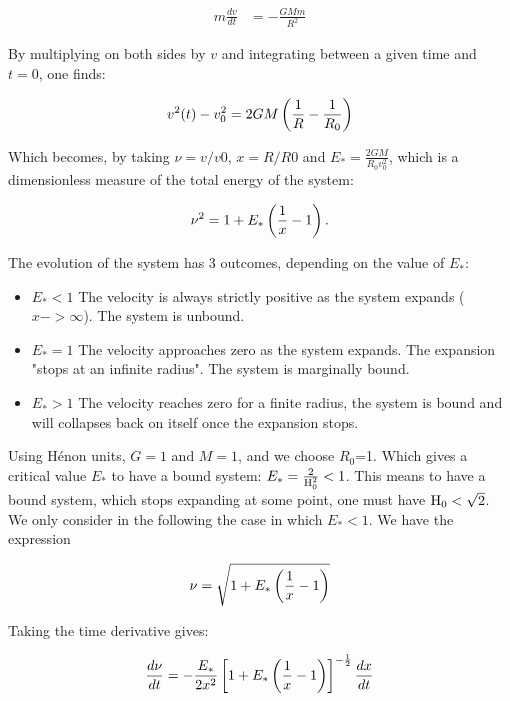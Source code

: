 \begin{align}\label{eq:newton}
m \frac{dv}{dt} & = - \frac{G M m}{R^2}
\end{align}

By multiplying on both sides by $v$ and integrating between a given time and $t=0$, one finds:

\begin{equation}
v^2(t) - v^2_0 = 2GM \left( \frac{1}{R} - \frac{1}{R_0} \right)
\end{equation}

Which becomes, by taking $\nu = v/v0$,  $x= R/R0$ and $E_\ast = \frac{2GM}{R_0 v_0^2}$, which is a dimensionless measure of the total energy of the system:

\begin{equation}
\nu^2  = 1 + E_\ast \left( \frac{1}{x} - 1 \right) .
\end{equation}

The evolution of the system has 3 outcomes, depending on the value of $E_\ast$:
\begin{itemize}
\item $E_\ast<1$ The velocity is always strictly positive as the system expands ($x->\infty$). The system is unbound.
\item $E_\ast=1$ The velocity approaches zero as the system expands. The expansion "stops at an infinite radius". The system is marginally bound.
\item $E_\ast>1$ The velocity reaches zero for a finite radius, the system is bound and will collapses back on itself once the expansion stops. 
\end{itemize}

Using H\'enon units, $G=1$ and $M=1$, and we choose $R_0$=1. Which gives a critical value $E_*$ to have a bound system: $E_* = \frac{2}{{\textrm{H}}^2_0} < 1$. This means to have a bound system, which stops expanding at some point, one must have ${\textrm{H}}_0 < \sqrt{2}$.
We only consider in the following the case in which $E_\ast<1$. We have the expression

\begin{equation}
\nu = \sqrt{1+E_\ast\left(\frac{1}{x} - 1\right)}
\end{equation}

Taking the time derivative gives:

\begin{equation}
\frac{d \nu}{dt} = - \frac{E_\ast}{2 x^2} \left[ 1 + E_\ast\left(\frac{1}{x} -1\right)\right]^{-\frac{1}{2}} \frac{dx}{dt}
\end{equation}

